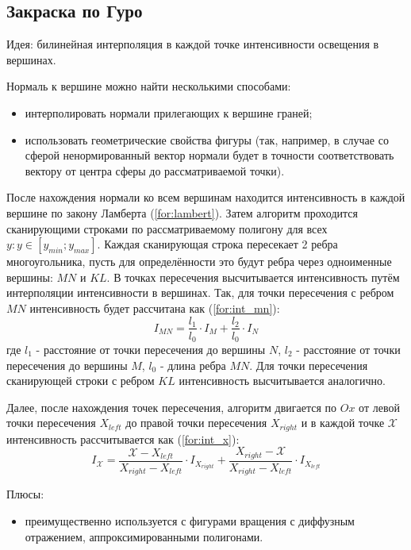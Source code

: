 \subsection{Закраска по Гуро}
Идея: билинейная интерполяция в каждой точке интенсивности освещения в вершинах\cite{lmodels}.

Нормаль к вершине можно найти несколькими способами:
\begin{itemize}
    \item интерполировать нормали прилегающих к вершине граней;
    \item использовать геометрические свойства фигуры (так, например, в случае со сферой ненормированный вектор нормали будет в точности соответствовать вектору от центра сферы до рассматриваемой точки).
\end{itemize}

После нахождения нормали ко всем вершинам находится интенсивность в каждой вершине по закону Ламберта (\ref{for:lambert}).
Затем алгоритм проходится сканирующими строками по рассматриваемому полигону для всех $y: y \in [y_{min}; y_{max}]$. Каждая сканирующая строка пересекает 2 ребра многоугольника, пусть для определённости это будут ребра через одноименные вершины: $MN$ и $KL$. В точках пересечения высчитывается интенсивность путём интерполяции интенсивности в вершинах. Так, для точки пересечения с ребром $MN$ интенсивность будет рассчитана как (\ref{for:int_mn}):
\begin{equation}
    \label{for:int_mn}
    I_{MN} = \frac{l_1}{l_0} \cdot I_M + \frac{l_2}{l_0} \cdot I_N
\end{equation}
где $l_1$ - расстояние от точки пересечения до вершины $N$, $l_2$ - расстояние от точки пересечения до вершины $M$, $l_0$ - длина ребра $MN$.
Для точки пересечения сканирующей строки с ребром $KL$ интенсивность высчитывается аналогично.

Далее, после нахождения точек пересечения, алгоритм двигается по $Ox$ от левой точки пересечения $X_{left}$ до правой точки пересечения $X_{right}$ и в каждой точке $\mathcal{X}$ интенсивность рассчитывается как (\ref{for:int_x}):
\begin{equation}
    \label{for:int_x}
    I_{\mathcal{X}} = \frac{\mathcal{X} - X_{left}}{X_{right} - X_{left}} \cdot I_{X_{right}} + \frac{X_{right} - \mathcal{X}}{X_{right} - X_{left}} \cdot I_{X_{left}}
\end{equation}

Плюсы:
\begin{itemize}
    \item преимущественно используется с фигурами вращения с диффузным отражением, аппроксимированными полигонами.
\end{itemize}

